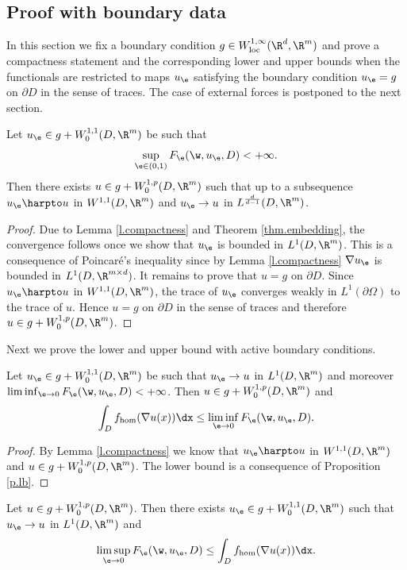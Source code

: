 \subsection{Proof with boundary data}
In this section we fix a boundary condition $g\in W_\mathrm{loc}^{1,\infty}(\R^d,\R^m)$ and prove a compactness statement and the corresponding lower and upper bounds when the functionals are restricted to maps $u_{\e}$ satisfying the boundary condition $u_{\e}=g$ on $\partial D$ in the sense of traces. The case of external forces is postponed to the next section.
\begin{lemma}\label{l.boundarycompactness}
Let $u_{\e}\in g+W^{1,1}_0(D,\R^m)$ be such that
\begin{equation*}
\sup_{\e\in (0,1)}F_{\e}(\w,u_{\e},D)<+\infty.
\end{equation*}
Then there exists $u\in g+W_0^{1,p}(D,\R^m)$ such that up to a subsequence $u_{\e}\harpto u$ in $W^{1,1}(D,\R^m)$ and $u_{\e}\to u$ in $L^{\frac{d}{d-1}}(D,\R^m)$.
\end{lemma}
\begin{proof}
Due to Lemma \ref{l.compactness} and Theorem \ref{thm.embedding}, the convergence follows once we show that $u_{\e}$ is bounded in $L^1(D,\R^m)$. This is a consequence of Poincaré's inequality since by Lemma \ref{l.compactness} $\nabla u_{\e}$ is bounded in $L^1(D,\R^{m\times d})$. It remains to prove that $u=g$ on $\partial D$. Since $u_{\e}\harpto u$ in $W^{1,1}(D,\R^m)$, the trace of $u_{\e}$ converges weakly in $L^1(\partial\Omega)$ to the trace of $u$. Hence $u=g$ on $\partial D$ in the sense of traces and therefore $u\in g+W_0^{1,p}(D,\R^m)$.
\end{proof}
Next we prove the lower and upper bound with active boundary conditions.
\begin{proposition}\label{p.lb_contrained}
Let $u_{\e}\in g+W_0^{1,1}(D,\R^m)$ be such that $u_{\e}\to u$ in $L^1(D,\R^m)$ and moreover $\liminf_{\e\to 0}F_{\e}(\w,u_{\e},D)<+\infty$. Then $u\in g+W_0^{1,p}(D,\R^m)$ and
\begin{equation*}
\int_D f_{\hom}(\nabla u(x))\dx\leq \liminf_{\e\to 0}F_{\e}(\w,u_{\e},D).
\end{equation*}
\end{proposition}
\begin{proof}
By Lemma \ref{l.compactness} we know that $u_{\e}\harpto u$ in $W^{1,1}(D,\R^m)$ and $u\in g+W_0^{1,p}(D,\R^m)$. The lower bound is a consequence of Proposition \ref{p.lb}.
\end{proof}
%
\begin{proposition}\label{p.ub_constrained}
Let $u\in g+W_0^{1,p}(D,\R^m)$. Then there exists $u_{\e}\in g+W_0^{1,1}(D,\R^m)$ such that $u_{\e}\to u$ in $L^1(D,\R^m)$ and
\begin{equation*}
\limsup_{\e\to 0}F_{\e}(\w,u_{\e},D)\leq\int_D f_{\hom}(\nabla u(x))\dx.
\end{equation*}
\end{proposition}
